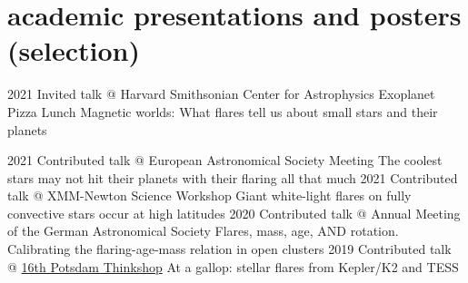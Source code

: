 \documentclass[9.5pt]{k-cv} %
\begin{document}
\section{academic presentations and posters (selection)}

\begin{entrylist}
\entry
{2021}
{Invited talk @ Harvard Smithsonian Center for Astrophysics Exoplanet Pizza Lunch}
{}%
{Magnetic worlds: What flares tell us about small stars and their planets}

\entry
{2021}
{Contributed talk @ European Astronomical Society Meeting}
{}%
{The coolest stars may not hit their planets with their flaring all that much}
\entry
{2021}
{Contributed talk @ XMM-Newton Science Workshop}
{}%
{Giant white-light flares on fully convective stars occur at high latitudes}
\entry
{2020}
{Contributed talk @ Annual Meeting of the German Astronomical Society}
{}%
{Flares, mass, age, AND rotation. Calibrating the flaring-age-mass relation in open clusters}
\entry
{2019}
{Contributed talk @ \href{https://thinkshop.aip.de/16/cms/} {16th Potsdam Thinkshop}}
{}%
{At a gallop: stellar flares from Kepler/K2 and TESS}

\end{entrylist}
\end{document}
